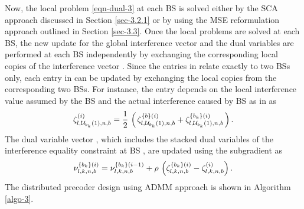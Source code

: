 Now, the local problem \eqref{eqn-dual-3} at each \ac{BS}  is solved either by the \ac{SCA} approach discussed in Section \ref{sec-3.2.1} or by using the \ac{MSE} reformulation approach outlined in Section \ref{sec-3.3}. Once the local problems are solved at each \ac{BS}, the new update for the global interference vector  and the dual variables  are performed at each \ac{BS} independently by exchanging the corresponding local copies of the interference vector . Since the entries in  relate exactly to two \acp{BS} only, each entry in  can be updated by exchanging the local copies from the corresponding two \acp{BS}. For instance, the entry  depends on the local interference value  assumed by the \ac{BS}  and the actual interference caused by \ac{BS}  as in  as
\begin{equation}
\zeta_{l,\mc{U}_{b_k}(1),n,b}^{(i)} = \frac{1}{2} \, \left ( \, \zeta^{\set{b}(i)}_{l,\mc{U}_{b_k}(1),n,b} + \zeta^{\set{b_k}(i)}_{l,\mc{U}_{b_k}(1),n,b} \, \right ).
\label{zeta_update}
\end{equation}
The dual variable vector , which includes the stacked dual variables of the interference equality constraint at \ac{BS} , are updated using the subgradient as
\begin{equation}\label{dual-sg-update}
\nu^{\set{b_k}(i)}_{l,k,n,b} = \nu^{\set{b_k}(i-1)}_{l,k,n,b} + \rho \, \left (\zeta^{\set{b_k}(i)}_{l,k,n,b} - \zeta^{(i)}_{l,k,n,b} \right ).
\end{equation}
The distributed precoder design using \ac{ADMM} approach is shown in Algorithm \ref{algo-3}.
